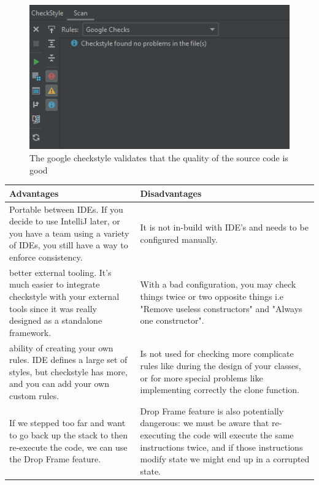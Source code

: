 \documentclass[11pt, english]{report}
\begin{document}
\begin{figure}[H]
  
  \includegraphics[width=1\textwidth]{d2p3.PNG}
  \centering
  \caption{ The google checkstyle validates that the quality of the source code is good 
}
\end{figure}

\setlength{\tabcolsep}{18pt}
\renewcommand{\arraystretch}{1.5}
\begin{tabular}{ |p{6cm}|p{6cm}| }
\hline
\textbf{Advantages} & \textbf{Disadvantages}\\ \hline 
Portable between IDEs. If you decide to use IntelliJ later, or you have a team using a variety of IDEs, you still have a way to enforce consistency.
 & It is not in-build with IDE's and needs to be configured manually.\\
\hline
better external tooling. It's much easier to integrate checkstyle with your external tools since it was really designed as a standalone framework. & With a bad configuration, you may check things twice or two opposite things i.e "Remove useless constructors" and "Always one constructor".\\
\hline
ability of creating your own rules. IDE defines a large set of styles, but checkstyle has more, and you can add your own custom rules.  & Is not used for checking more complicate rules like during the design of your classes, or for more special problems like implementing correctly the clone function. \\
\hline
If we stepped too far and want to go back up the stack to then re-execute the code, we can use the Drop Frame feature. & Drop Frame feature is also potentially dangerous: we must be aware that re-executing the code will execute the same instructions twice, and if those instructions modify state we might end up in a corrupted state.\\
\hline
\end{tabular} \\ \\ \\ 
\end{document}
